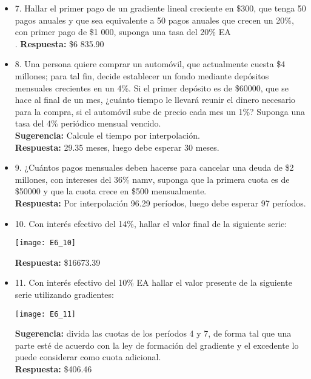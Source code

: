 \begin{itemize}
	\item 7. Hallar el primer pago de un gradiente lineal creciente en \$300, que tenga 50 pagos anuales y que sea equivalente a 50 pagos anuales que crecen un 20\%, con primer pago de \$1 000, suponga una tasa del 20\% EA\\.
	\textbf{Respuesta:} \$6 835.90\\
	\medskip
	
	\item 8. Una persona quiere comprar un automóvil, que actualmente cuesta \$4 millones; para tal fin, decide establecer un fondo mediante depósitos mensuales crecientes en un 4\%. Si el primer depósito es de \$60000, que se hace al final de un mes, ¿cuánto tiempo le llevará reunir el dinero necesario para la compra, si el automóvil sube de precio cada mes un 1\%? Suponga una tasa del 4\% periódico mensual vencido.\\
	\textbf{Sugerencia:} Calcule el tiempo por interpolación.\\
	\textbf{Respuesta:} 29.35 meses, luego debe esperar 30 meses.\\
	\medskip
	
	\item 9. ¿Cuántos pagos mensuales deben hacerse para cancelar una deuda de \$2 millones, con intereses del 36\% namv, suponga que la primera cuota es de \$50000 y que la cuota crece en \$500 mensualmente.\\
	\textbf{Respuesta:} Por interpolación 96.29 períodos, luego debe esperar 97 períodos.\\
	\medskip
	
	\item 10. Con interés efectivo del 14\%, hallar el valor final de la siguiente serie:\\
	\begin{center}
		\texttt{[image: E6\_10]}
	\end{center}
	\textbf{Respuesta:} \$16673.39\\
	\medskip
	
	\item 11. Con interés efectivo del 10\% EA hallar el valor presente de la siguiente serie utilizando gradientes: 
	\begin{center}
		\texttt{[image: E6\_11]}
	\end{center}
	\textbf{Sugerencia:} divida las cuotas de los períodos 4 y 7, de forma tal que una parte esté de acuerdo con la ley de formación del gradiente y el excedente lo puede considerar como cuota adicional.\\
	\textbf{Respuesta:} \$406.46\
	\medskip
	

\end{itemize}
